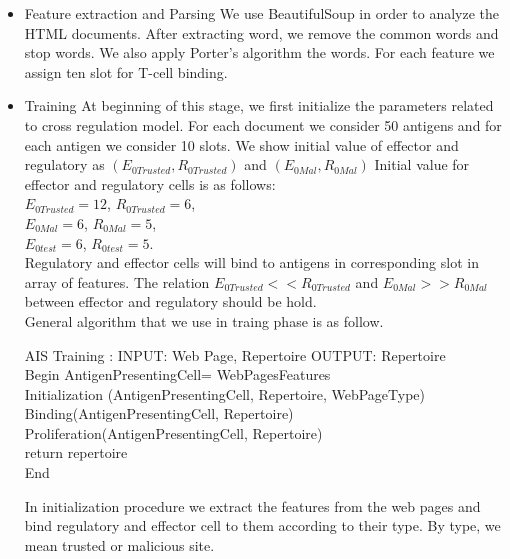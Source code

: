 \documentclass{llncs}
\begin{document}
\begin{itemize}
\item Feature extraction and Parsing
We use BeautifulSoup in order to analyze the HTML documents.  After extracting word, we remove the common words and stop words.  We also apply  Porter’s algorithm the words. For each feature we assign ten slot for T-cell binding.
\item Training 
At beginning of this stage, we first initialize the parameters related to cross regulation model. For each document we consider 50 antigens and for each antigen we consider 10 slots. We show initial value of  effector and regulatory as $(E_{0Trusted}, R_{0Trusted })$ and $ (E_{0Mal}, R_{0Mal})$  Initial value for effector and regulatory cells is as follows:\\
$E_{0Trusted} =12$, $R_{0Trusted }=6$,\\ 
$E_{0Mal} =6$, $R_{0Mal }=5$, \\
$E_{0test} =6$, $R_{0test }=5$.\\
Regulatory and effector cells will bind to antigens in corresponding slot in array of features.  The relation $E_{0Trusted}<<R_{0Trusted}$ and $ E_{0Mal}>> R_{0Mal}$  between effector and regulatory should be hold.\\

General algorithm that we use in traing phase is as follow.\\
\begin{algorithmic}
\STATE AIS Training :  INPUT: Web Page, Repertoire OUTPUT: Repertoire\\
\STATE Begin 
\STATE  AntigenPresentingCell= WebPagesFeatures\\
\STATE Initialization (AntigenPresentingCell, Repertoire, WebPageType)\\
\STATE Binding(AntigenPresentingCell, Repertoire)\\
\STATE Proliferation(AntigenPresentingCell, Repertoire)\\
\STATE return repertoire\\
\STATE End\\
\end{algorithmic}
In initialization procedure we extract the features from  the web pages and bind regulatory and effector cell to them according to their type. By type, we mean trusted or malicious site.\\ 


\end{itemize}
\end{document}
